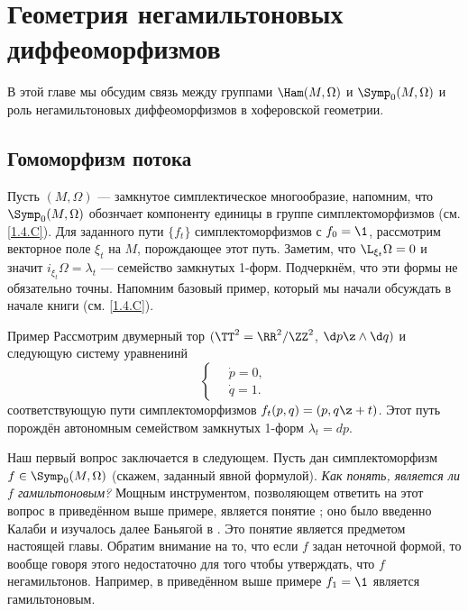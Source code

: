 \chapter[Негамильтоновы диффеоморфизмы]{Геометрия негамильтоновых диффеоморфизмов}\label{chap:14}

В этой главе мы обсудим связь между группами $\Ham(M,\Omega)$ и $\Symp_0(M,\Omega)$ и роль негамильтоновых диффеоморфизмов в хоферовской геометрии.

\section{Гомоморфизм потока}\label{sec:14.1}

Пусть $(M,\Omega)$ — замкнутое симплектическое многообразие,
напомним, что $\Symp_0(M,\Omega)$ обознчает компоненту единицы в
группе симплектоморфизмов (см. \ref{1.4.C}).
Для заданного пути $\{f_t\}$ симплектоморфизмов с $f_0 = \1$,
рассмотрим векторное поле $\xi_t$ на $M$, порождающее этот путь.
Заметим, что $\L_{\xi_t}\Omega=0$ и значит
$i_{\xi_t}\Omega=\lambda_t$ — семейство замкнутых 1-форм.
Подчеркнём, что эти формы не обязательно точны.
Напомним базовый пример, который мы начали обсуждать в начале книги
(см. \ref{1.4.C}). 


\begin{thm}{Пример}\label{14.1.A}
Рассмотрим двумерный тор $(\TT^2=\RR^2/\ZZ^2$, $\d p\z\wedge \d q)$ и
следующую систему уравненинй 
\[
\begin{cases}
\quad\dot p=0,
\\
\quad\dot q=1.
\end{cases}
\]
соответствующую пути симплектоморфизмов $f_t(p, q) = (p, q \z+ t)$.
Этот путь порождён автономным семейством замкнутых 1-форм $\lambda_t = dp$.
\end{thm}


Наш первый вопрос заключается в следующем.
Пусть дан симплектоморфизм $f\in\Symp_0(M,\Omega)$ (скажем, заданный
явной формулой).
\textit{Как понять, является ли $f$ гамильтоновым?}
Мощным инструментом, позволяющем ответить на этот вопрос в приведённом
выше примере, является понятие ; оно было
введенно Калаби и изучалось далее
Баньягой в \cite{B1}.
Это понятие является предметом настоящей главы.
Обратим внимание на то, что если $f$ задан неточной формой, то вообще
говоря этого недостаточно для того чтобы утверждать, что $f$
негамильтонов.
Например, в приведённом выше примере $f_1 = \1$ является гамильтоновым.

